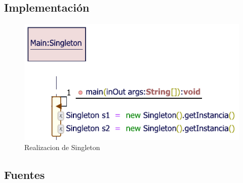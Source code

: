 \subsection{Implementación}
\begin{figure}[h!]
	\centering
	\includegraphics[width=0.7\linewidth]{PATRONES/imgs/MISingleton}
	\caption{Realizacion de Singleton}
	\label{fig:mrsingleton}
\end{figure}
\newpage
%

\subsection{Fuentes}